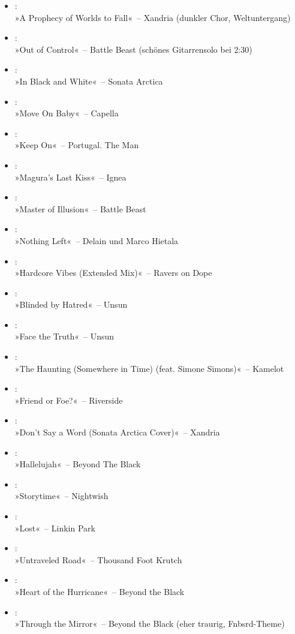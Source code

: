 \begin{itemize}
    \item :\\ »A Prophecy of Worlds to Fall«~– Xandria (dunkler Chor, Weltuntergang)
    \item :\\ »Out of Control«~– Battle Beast (schönes Gitarrensolo bei 2:30)
    \item :\\ »In Black and White«~– Sonata Arctica
    \item :\\ »Move On Baby«~– Capella
    \item :\\ »Keep On«~– Portugal. The Man
    \item :\\ »Magura’s Last Kiss«~– Ignea
    \item :\\ »Master of Illusion«~– Battle Beast
    \item :\\ »Nothing Left«~– Delain und Marco Hietala
    \item :\\ »Hardcore Vibes (Extended Mix)«~– Ravers on Dope
    \item :\\ »Blinded by Hatred«~– Unsun
    \item :\\ »Face the Truth«~– Unsun
    \item :\\ »The Haunting (Somewhere in Time) (feat. Simone Simons)«~– Kamelot
    \item :\\ »Friend or Foe?«~– Riverside
    \item :\\ »Don’t Say a Word (Sonata Arctica Cover)«~– Xandria
    \item :\\ »Hallelujah«~– Beyond The Black
    \item :\\ »Storytime«~– Nightwish
    \item :\\ »Lost«~– Linkin Park
    \item :\\ »Untraveled Road«~– Thousand Foot Krutch
    \item :\\ »Heart of the Hurricane«~– Beyond the Black
    \item :\\ »Through the Mirror«~– Beyond the Black (eher traurig, Fnbsrd-Theme)

\end{itemize}

